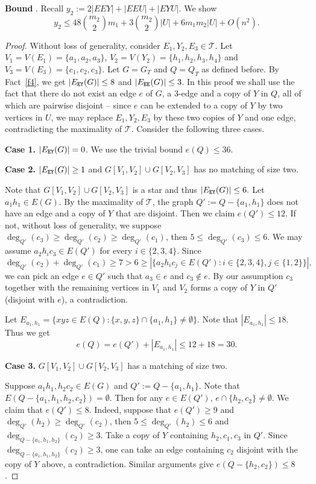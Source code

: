 \documentclass[11pt, reqno]{amsart}    	%
\theoremstyle{definition}
\def\cT{\mathcal T}
\numberwithin{equation}{section}
\begin{document}
	\noindent\textbf{Bound} .
 Recall 
	$y_{2}:= 2|EEY|+|EEU|+|EYU|.$ 
	We show \[y_{2}\le 48\binom{m_2}{2}m_1+3\binom{m_2}{2}|U|+6m_1m_2|U|+O(n^2).\]
	\begin{proof}	
		Without loss of generality, consider $E_1,Y_2,E_3\in \cT$. Let $ V_{1}=V(E_1)=\{a_{1},a_{2},a_{3}\}$, $V_{2}=V(Y_2)=\{h_{1},h_{2},h_{3},h_4\}$ and $V_{3}=V(E_3)=\{c_{1},c_{2},c_{3}\}$. Let $G=G_T$ and $Q=Q_T$ as defined before. By Fact~\ref{f4}, we get $|E_{\tt EY}(G)|\le8$ and $|E_{\tt EE}(G)|\le3$. 
		In this proof we shall use the fact that there do not exist an edge $e$ of $G$, a $3$-edge and a copy of $Y$ in $Q$, all of which are pairwise disjoint -- since $e$ can be extended to a copy of $Y$ by two vertices in $U$, we may replace $E_1,Y_2,E_3$ by these two copies of $Y$ and one edge, contradicting the maximality of $\cT$.  
		Consider the following three cases.
		
		\textbf{Case 1.} $ |E_{\tt EY}(G)|=0 $. We use the trivial bound $ e(Q)\le 36 $.
		
		\textbf{Case 2.} $ |E_{\tt EY}(G)|\ge1 $ and $G[V_{1},V_{2}]\cup G[V_{2},V_{3}]$ has no matching of size two. 
		
		Note that $G[V_{1},V_{2}]\cup G[V_{2},V_{3}]$ is a star and thus $ |E_{\tt EY}(G)|\le6. $ Let $ a_1h_1\in E(G) $. By the maximality of $\cT$, the graph $Q':=Q-\{ a_1,h_1\}$ does not have an edge and a copy of $Y$ that are disjoint. Then we claim $ e(Q')\le 12$. 
		If not, without loss of generality, we suppose $ \deg_{Q'}(c_{3})\ge \deg_{Q'}(c_{2})\ge \deg_{Q'}(c_{1}) $, then $ 5\le \deg_{Q'}(c_{3})\le6$. 
		We may assume $ a_{2}h_{i}c_{3}\in E(Q') $ for every $i\in\{2,3,4\}$.
		Since 
		\[
		\deg_{Q'}(c_{2})+ \deg_{Q'}(c_{1})\ge7>6\ge |\{a_2h_ic_j\in E(Q'):i\in \{2,3,4 \} ,j\in \{1,2\}\}|,
		\]
		we can pick an edge $e\in Q'$ such that $a_3\in e$ and $c_{3}\notin e$. 
		By our assumption $c_{3}$ together with the remaining vertices in $ V_{1}$ and $V_{2} $ forms a copy of $Y$ in $Q'$ (disjoint with $e$), a contradiction.
		
		Let $ E_{a_{1},h_{1}} =\{xyz\in E(Q):\{x,y,z\}\cap\{a_{1},h_{1}\}\not= \emptyset\}$.
		Note that $ |E_{a_{1},h_{1}}|\le18$. Thus we get
		\[e(Q)= e(Q')+|E_{a_{1},h_{1}}|\le 12+18=30.\]
		
		
		\textbf{Case 3.} $G[V_{1},V_{2}]\cup G[V_{2},V_{3}]$ has a matching of size two. 	
		
		Suppose $a_{1}h_{1}, h_{2}c_{2}\in E(G)$ and $ Q':=Q-\{a_{1},h_{1}\} $. Note that $E(Q-\{a_{1},h_{1}, h_{2},c_{2}\})=\emptyset$. Then for any $e \in E(Q')$, $e \cap \{h_{2},c_{2}\}\not=\emptyset$. We claim that $e(Q')\le8$. Indeed, suppose that $ e(Q')\ge 9 $ and $ \deg_{Q'}(h_{2})\ge \deg_{Q'}(c_{2}) $, then  $ 5\le \deg_{Q'}(h_{2})\le 6 $ and $ \deg_{Q-\{a_{1}, h_{1}, h_2\}}(c_{2})\ge 3$. Take a copy of $Y$ containing $ h_{2}, c_1, c_3 $ in $ Q' $. 
		Since $ \deg_{Q-\{a_{1}, h_{1}, h_2\}}(c_{2})\ge 3$, one can take an edge containing $c_2$ disjoint with the copy of $Y$ above, a contradiction. 
		Similar arguments give $e(Q-\{h_{2},c_{2}\})\le8$.
		

\end{proof}
\end{document}
